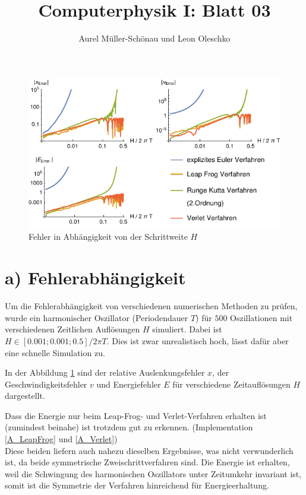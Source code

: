 




\title{Computerphysik I: Blatt 03}
\author{Aurel Müller-Schönau und Leon Oleschko}
\maketitle

\begin{figure}[h!]
	\centering
	\includegraphics[width=\linewidth]{A_plot.pdf}
	\caption{Fehler in Abhängigkeit von der Schrittweite $H$}
	\label{fig:fehler}
\end{figure}


\section*{a) Fehlerabhängigkeit}
Um die Fehlerabhängigkeit von verschiedenen numerischen Methoden zu prüfen, wurde ein harmonischer Oszillator (Periodendauer $T$) für $500$ Oszillationen mit verschiedenen Zeitlichen Auflösungen $H$ simuliert. Dabei ist $H\in[0.001;0.001;0.5]/2\pi T$. 
Dies ist zwar unrealistisch hoch, lässt dafür aber eine schnelle Simulation zu.

In der Abbildung \ref{fig:fehler} sind der relative Auslenkungsfehler $x$, der Geschwindigkeitsfehler $v$ und Energiefehler $E$ für verschiedene Zeitauflösungen $H$ dargestellt.

Dass die Energie nur beim Leap-Frog- und Verlet-Verfahren erhalten ist (zumindest beinahe) ist trotzdem gut zu erkennen. (Implementation \ref{A_LeapFrog} und \ref{A_Verlet})\\
Diese beiden liefern auch nahezu dieselben Ergebnisse, was nicht verwunderlich ist, da beide symmetrische Zweischrittverfahren sind. Die Energie ist erhalten, weil die Schwingung des harmonischen Oszillators unter Zeitumkehr invariant ist, somit ist die Symmetrie der Verfahren hinreichend für Energieerhaltung.

